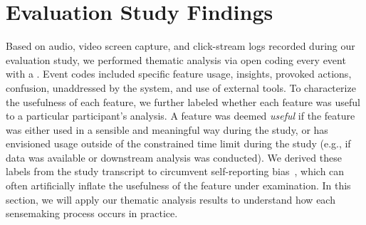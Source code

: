 \section{Evaluation Study Findings\label{sec:eval_findings}}
Based on audio, video screen capture,
and click-stream logs recorded
during our evaluation study,
we performed thematic analysis via open coding  every event with a . Event codes included specific feature usage,
insights,
provoked actions, confusion,
 unaddressed
by the system, and use of external tools. To characterize the usefulness
of each feature, we further labeled whether each
feature was useful to a particular participant's analysis.
A feature was deemed \textit{useful}
if the feature was either used in a sensible
and meaningful way during the study,
or has envisioned usage outside of the constrained
time limit during the study
(e.g., if data was available or downstream analysis was conducted).
We derived these labels from the study transcript
to circumvent self-reporting bias~\cite{Williams2017},
which can often artificially inflate
the usefulness of the feature under examination.
In this section, we will apply our thematic analysis results to understand how each sensemaking process occurs in practice.%

